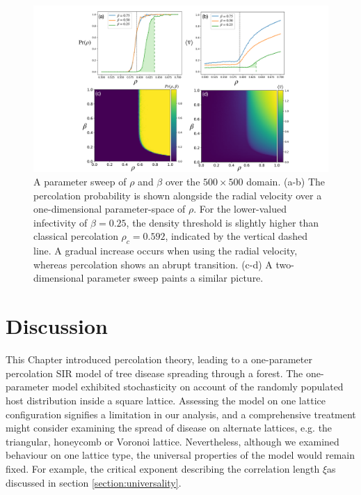 \begin{figure}
    \centering
    \includegraphics[scale=0.325]{chapter3/figures/figure4-perc-vel-phase-trans.pdf}
    \caption{
    A parameter sweep of $\rho$ and $\beta$ over the $500\times500$ domain. (a-b) The percolation probability is shown alongside the radial velocity over a one-dimensional parameter-space of $\rho$. For the lower-valued infectivity of $\beta=0.25$, the density threshold is slightly higher than classical percolation  $\rho_c=0.592$, indicated by the vertical dashed line. A gradual increase occurs when using the radial velocity, whereas percolation shows an abrupt transition. (c-d) A two-dimensional parameter sweep paints a similar picture.
    }
    \label{fig:slm_pspace}
\end{figure}

\newpage

\section{Discussion}

This Chapter introduced percolation theory, leading to a one-parameter percolation SIR model of tree disease spreading through a forest.
The one-parameter model exhibited stochasticity on account of the randomly populated host distribution inside a square lattice. 
Assessing the model on one lattice configuration signifies a limitation in our analysis, and a comprehensive treatment might consider examining the spread of disease on alternate lattices, e.g. the triangular, honeycomb or Voronoi lattice. Nevertheless, although we examined behaviour on one lattice type, the universal properties of the model would remain fixed. For example, the critical exponent describing the correlation length $\xi$\textemdash as discussed in section \ref{section:universality}.

